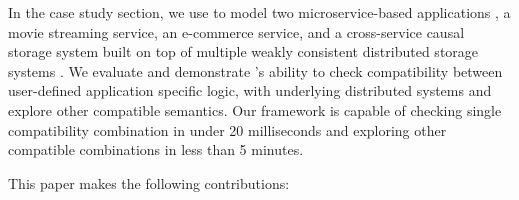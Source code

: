 
In the case study section, we use \sysname{} to model two microservice-based
applications \cite{gan2019an}, a movie streaming service, an e-commerce
service, and a cross-service causal storage system built on top of
multiple weakly consistent distributed storage systems \cite{boltoncc}.
We evaluate and demonstrate \sysname{}'s ability to check compatibility
between user-defined application specific logic, with underlying
distributed systems and explore other compatible semantics.
Our framework is capable of checking single compatibility combination in under 20 milliseconds and exploring
other compatible combinations in less than 5 minutes.


This paper makes the following contributions:

